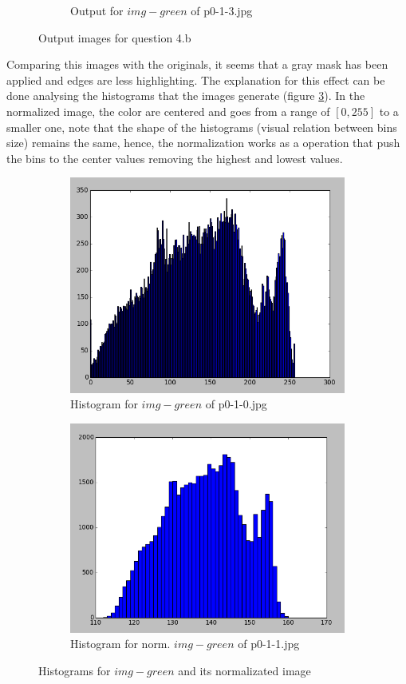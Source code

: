 \begin{enumerate}[label=\emph{\alph*)}]
\begin{figure}[h!]
\begin{subfigure}{0.5\textwidth}
  \caption{Output for $img-green$ of p0-1-3.jpg}
  \label{fig:sfig4}
\end{subfigure}
\caption{Output images for question 4.b}
\label{fig:green-normalization}
\end{figure}

Comparing this images with the originals, it seems that a gray mask has been applied and edges are less highlighting. The explanation for this effect can be done analysing the histograms that the images generate (figure \ref{fig:hist-normalization}). In the normalized image, the color are centered and goes from a range of $[0, 255]$ to a smaller one, note that the shape of the histograms (visual relation between bins size) remains the same, hence, the normalization works as a operation that push the bins to the center values removing the highest and lowest values.


\begin{figure}[h!]
\centering
\begin{subfigure}{0.5\textwidth}
  \centering
  \includegraphics[width=0.8\linewidth]{../dbg/hist-original.png}
  \caption{Histogram for $img-green$ of p0-1-0.jpg}
\end{subfigure}%
\begin{subfigure}{0.5\textwidth}
  \centering
  \includegraphics[width=0.8\linewidth]{../dbg/hist-normalized.png}
  \caption{Histogram for norm. $img-green$ of  p0-1-1.jpg}
\end{subfigure}
\caption{Histograms for $img-green$ and its normalizated image}
\label{fig:hist-normalization}
\end{figure}



\end{enumerate}
